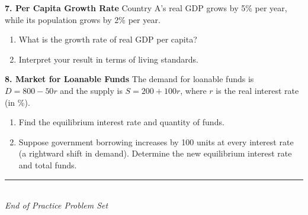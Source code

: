 \documentclass[12pt]{article}
\begin{document}
\textbf{7. Per Capita Growth Rate}  
Country A’s real GDP grows by 5\% per year, while its population grows by 2\% per year.
\begin{enumerate}
    \item What is the growth rate of real GDP per capita?
    \item Interpret your result in terms of living standards.
\end{enumerate}



\textbf{8. Market for Loanable Funds}  
The demand for loanable funds is \( D = 800 - 50r \) and the supply is \( S = 200 + 100r \), where \(r\) is the real interest rate (in \%).  
\begin{enumerate}
    \item Find the equilibrium interest rate and quantity of funds.
    \item Suppose government borrowing increases by 100 units at every interest rate (a rightward shift in demand).  
    Determine the new equilibrium interest rate and total funds.
\end{enumerate}



\begin{center}
\rule{0.5\textwidth}{0.4pt}\\
\textit{End of Practice Problem Set}
\end{center}
\end{document}

